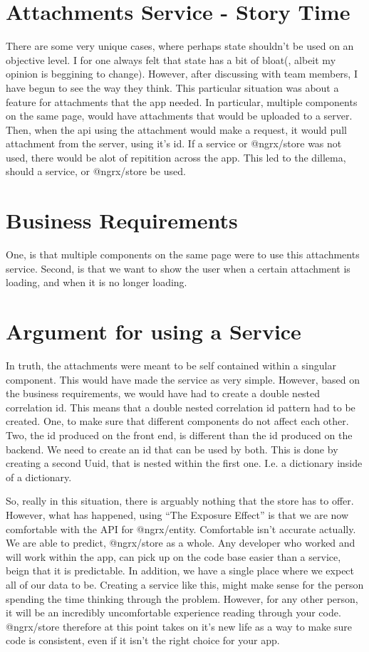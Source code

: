 \section{ Attachments Service - Story Time }
There are some very unique cases, where perhaps state shouldn't be used on an
objective level. I for one always felt that state has a bit of bloat(, albeit my
opinion is beggining to change). However, after discussing with team members,
I have begun to see the way they think. This particular situation was about a
feature for attachments that the app needed. In particular, multiple components
on the same page, would have attachments that would be uploaded to a server.
Then, when the api using the attachment would make a request, it would pull
attachment from the server, using it's id. If a service or @ngrx/store was not
used, there would be alot of repitition across the app. This led to the dillema,
should a service, or @ngrx/store be used.

\section{ Business Requirements }
One, is that multiple components on the same page were to use this attachments
service. Second, is that we want to show the user when a certain attachment is
loading, and when it is no longer loading.

\section{ Argument for using a Service }
In truth, the attachments were meant to be self contained within a singular
component. This would have made the service as very simple. However, based on
the business requirements, we would have had to create a double nested
correlation id. This means that a double nested correlation id pattern had to be
created. One, to make sure that different components do not affect each other.
Two, the id produced on the front end, is different than the id produced on the
backend. We need to create an id that can be used by both. This is done by
creating a second Uuid, that is nested within the first one. I.e. a dictionary
inside of a dictionary.

So, really in this situation, there is arguably nothing that the store has to
offer. However, what has happened, using ``The Exposure Effect'' is that we are
now comfortable with the API for @ngrx/entity. Comfortable isn't accurate
actually. We are able to predict, @ngrx/store as a whole. Any developer who
worked and will work within the app, can pick up on the code base easier than
a service, beign that it is predictable. In addition, we have a single place
where we expect all of our data to be. Creating a service like this, might make
sense for the person spending the time thinking through the problem. However,
for any other person, it will be an incredibly uncomfortable experience reading
through your code. @ngrx/store therefore at this point takes on it's new life
as a way to make sure code is consistent, even if it isn't the right choice for
your app.

